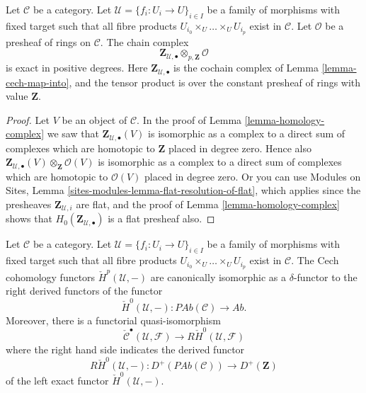 \begin{lemma}
\label{lemma-complex-tensored-still-exact}
Let $\mathcal{C}$ be a category. Let
$\mathcal{U} = \{f_i : U_i \to U\}_{i \in I}$ be a family of morphisms
with fixed target such that all fibre products
$U_{i_0} \times_U \ldots \times_U U_{i_p}$ exist in $\mathcal{C}$.
Let $\mathcal{O}$ be a presheaf of rings on $\mathcal{C}$.
The chain complex
$$
\mathbf{Z}_{\mathcal{U}, \bullet}
\otimes_{p, \mathbf{Z}}
\mathcal{O}
$$
is exact in positive degrees. Here $\mathbf{Z}_{\mathcal{U}, \bullet}$
is the cochain complex of Lemma \ref{lemma-cech-map-into}, and
the tensor product is over the constant presheaf of rings
with value $\mathbf{Z}$.
\end{lemma}

\begin{proof}
Let $V$ be an object of $\mathcal{C}$.
In the proof of Lemma \ref{lemma-homology-complex} we saw that
$\mathbf{Z}_{\mathcal{U}, \bullet}(V)$ is isomorphic as a complex
to a direct sum of complexes which are homotopic to $\mathbf{Z}$
placed in degree zero. Hence also
$\mathbf{Z}_{\mathcal{U}, \bullet}(V) \otimes_\mathbf{Z} \mathcal{O}(V)$
is isomorphic as a complex to a direct sum of complexes which are homotopic
to $\mathcal{O}(V)$ placed in degree zero.
Or you can use
Modules on Sites, Lemma \ref{sites-modules-lemma-flat-resolution-of-flat},
which applies since the presheaves $\mathbf{Z}_{\mathcal{U}, i}$ are flat,
and the proof of Lemma \ref{lemma-homology-complex} shows that
$H_0(\mathbf{Z}_{\mathcal{U}, \bullet})$ is a flat presheaf also.
\end{proof}

\begin{lemma}
\label{lemma-cech-cohomology-derived-presheaves}
Let $\mathcal{C}$ be a category. Let
$\mathcal{U} = \{f_i : U_i \to U\}_{i \in I}$ be a family of morphisms
with fixed target such that all fibre products
$U_{i_0} \times_U \ldots \times_U U_{i_p}$ exist in $\mathcal{C}$.
The Cech cohomology functors $\check{H}^p(\mathcal{U}, -)$
are canonically isomorphic as a $\delta$-functor to
the right derived functors of the functor
$$
\check{H}^0(\mathcal{U}, -) :
\textit{PAb}(\mathcal{C})
\longrightarrow
\textit{Ab}.
$$
Moreover, there is a functorial quasi-isomorphism
$$
\check{\mathcal{C}}^\bullet(\mathcal{U}, \mathcal{F})
\longrightarrow
R\check{H}^0(\mathcal{U}, \mathcal{F})
$$
where the right hand side indicates the derived functor
$$
R\check{H}^0(\mathcal{U}, -) :
D^{+}(\textit{PAb}(\mathcal{C}))
\longrightarrow
D^{+}(\mathbf{Z})
$$
of the left exact functor $\check{H}^0(\mathcal{U}, -)$.
\end{lemma}

